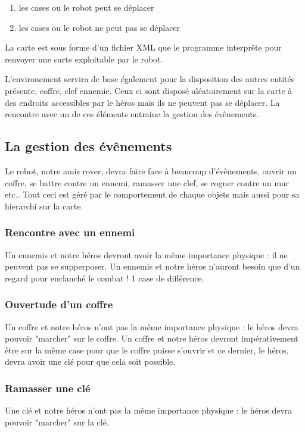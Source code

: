 \documentclass[a4paper 12pts]{article}
\begin{document}
\begin{enumerate}
	\item les cases ou le robot peut se déplacer
	\item les cases ou le robot ne peut pas se déplacer
\end{enumerate}

La carte est sous forme d'un fichier XML que le programme interprête pour renvoyer une carte exploitable par le robot.

L'environement servira de base également pour la disposition des autres entités présente, coffre, clef ennemie.
Ceux ci sont disposé aléatoirement sur la carte à des endroits accessibles par le héros mais ils ne peuvent pas se déplacer.
La rencontre avec un de ces éléments entraine la gestion des évênements.





\subsection{La gestion des évênements}

Le robot, notre amis rover, devra faire face à beaucoup d'évênements, ouvrir un coffre, se battre contre un ennemi, ramasser une clef, se cogner contre un mur etc..
Tout ceci est géré par le comportement de chaque objets mais aussi pour sa hierarchi sur la carte.

\subsubsection {Rencontre avec un ennemi} 
Un ennemis et notre héros devront avoir la même importance physique : il ne peuvent pas se supperposer.
Un ennemis et notre héros n'auront besoin que d'un regard pour enclanché le combat ! 1 case de différence.


\subsubsection {Ouvertude d'un coffre}
Un coffre et notre héros n'ont pas la même importance physique : le héros devra pouvoir "marcher" sur le coffre.
Un coffre et notre héros devront impérativement être sur la même case pour que le coffre puisse s'ouvrir et ce dernier, 
le héros, devra avoir une clé pour que cela soit possible.


\subsubsection {Ramasser une clé}
Une clé et notre héros n'ont pas la même importance physique : le héros devra pouvoir "marcher" sur la clé.
\end{document}

